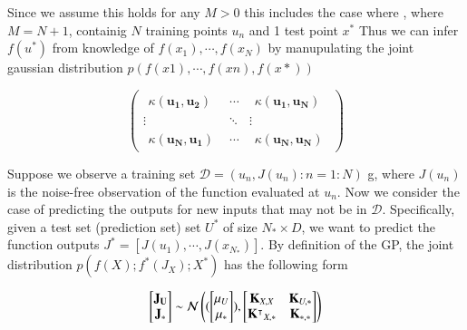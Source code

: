 \documentclass[]{elsarticle} %
\begin{document}
Since we assume this holds for any \(M>0\) this includes the case where , where \(M=N+1\), containig \(N\) training points \(u_n\) and 1 test point \(x^*\) Thus we can infer \(f(u^*)\) from knowledge of \(f(x_1), \cdots,f(x_N)\) by manupulating the joint gaussian distribution \(p(f(x1), \cdots, f(xn), f(x*))\)

\begin{equation}
\left (
\begin{array}{ccc}
\begin{array}{l}
\kappa(\mathbf{u_1},\mathbf{u_2})
\end{array}
& \cdots & 
\begin{array}{l}
\kappa(\mathbf{u_1},\mathbf{u_N})
\end{array} \\
\vdots & \ddots & \vdots\\
\begin{array}{l}
\kappa(\mathbf{u_N},\mathbf{u_1})
\end{array} &
\cdots & 
\begin{array}{l}
\kappa(\mathbf{u_N},\mathbf{u_N})
\end{array} 
\end{array}
\right )
\label{eq:kernel_struct}
\end{equation}

Suppose we observe a training set \(\mathcal{D}={(u_n,J(u_n) : n=1:N )}\) g, where \(J(u_n)\) is the noise-free observation of the function evaluated at \(u_n\). Now we consider the case of predicting the outputs for new inputs that may not be in \(\mathcal{D}\). Specifically, given a test set (prediction set) set \(U^*\) of size \(N_* \times D\), we want to predict the function outputs \(J^* = [J(u_1),\cdots, J(x_{N_*})]\). By definition of the GP, the joint distribution \(p(f(X); f^*(J_X); X^*)\) has the following form

\begin{equation}
\begin{bmatrix}  {\bf {J}_U}  \\  {{\bf J}_*} \end{bmatrix} \sim \mathcal{N} \begin{pmatrix} (\begin{bmatrix}  {{\bf \mu}_U}  \\  {{\bf \mu}_*} \end{bmatrix}),\begin{bmatrix} {{\bf K}_{X,X}}  & {{\bf
K}_{U,*}}  \\  {{\bf \mathbf{K}^\intercal}_{X,*}} & {{\bf K}_{*,*} } \end{bmatrix}\end{pmatrix}
\label{eq:gp_model}
\end{equation}
\end{document}

